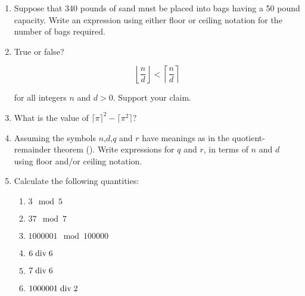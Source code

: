 \begin{enumerate}
\item Suppose that 340 pounds of sand must be placed into bags having
  a 50 pound capacity.  Write an expression using either floor or
  ceiling notation for the number of bags required.

\wbvfill


\item True or false? 

\[ \left\lfloor \frac{n}{d}\right\rfloor < \left\lceil \frac{n}{d}\right\rceil \]
 
\noindent for all integers $n$ and $d>0$. Support your claim.

\wbvfill


\workbookpagebreak

\item What is the value of $\lceil\pi\rceil^{2}-\lceil\pi^{2}\rceil$?

\wbvfill




\item Assuming the symbols $n$,$d$,$q$ and $r$ have meanings as in the
  quotient-remainder theorem ().  Write
  expressions for $q$ and $r$, in terms of $n$ and $d$ using floor
  and/or ceiling notation.

\wbvfill


\textbookpagebreak
\hintspagebreak

\item Calculate the following quantities:

\begin{enumerate}
\item \wbitemsep $3 \mod 5$
\item \wbitemsep $37 \mod 7$
\item \wbitemsep $1000001 \mod 100000$
\item \wbitemsep $6 \; \mbox{div} \; 6$
\item \wbitemsep $7 \; \mbox{div} \; 6$
\item \wbitemsep $1000001 \; \mbox{div} \; 2$
\end{enumerate}


\end{enumerate}
